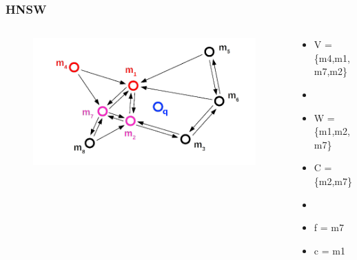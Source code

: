 \documentclass{beamer}
\begin{document}
	\begin{frame}
		\frametitle{HNSW}
		\begin{columns}[T] %
			\begin{column}{.6\textwidth}
				\begin{figure}
					\includegraphics[scale=0.3]{figures/HNSW_b6.png}
				\end{figure}
			\end{column}%
			\hfill%
			\begin{column}{.4\textwidth}
				\begin{itemize}
					\item V = \{m4,m1,m7,m2\}
					\item[]
					\item W = \{m1,m2,m7\}
					\item C = \{m2,m7\}
					\item[]
					\item f = m7
					\item c = m1
				\end{itemize}
			\end{column}%
		\end{columns}
	\end{frame}
\end{document}
